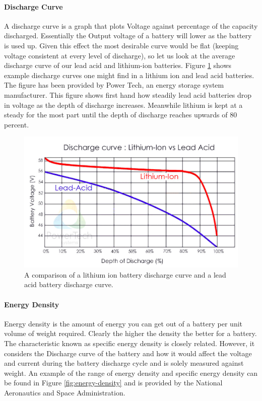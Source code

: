 \paragraph{Discharge Curve}
A discharge curve is a graph that plots Voltage against percentage of the capacity discharged. Essentially the Output voltage of a battery will lower as the battery is used up. Given this effect the most desirable curve would be flat (keeping voltage consistent at every level of discharge), so let us look at the average discharge curve of our lead acid and lithium-ion batteries. Figure \ref{fig:discharge-curve} shows example discharge curves one might find in a lithium ion and lead acid batteries. The figure has been provided by Power Tech, an energy storage system manufacturer. This figure shows first hand how steadily lead acid batteries drop in voltage as the depth of discharge increases. Meanwhile lithium is kept at a steady for the most part until the depth of discharge reaches upwards of 80 percent.

\begin{figure}
    \centering
    \includegraphics[scale=0.4]{figures/discharge curve.png}
    \caption{A comparison of a lithium ion battery discharge curve and a lead acid battery discharge curve.}
    \label{fig:discharge-curve} 
\end{figure}

\paragraph{Energy Density}
Energy density is the amount of energy you can get out of a battery per unit volume of weight required. Clearly the higher the density the better for a battery. The characteristic known as specific energy density is closely related. However, it considers the Discharge curve of the battery and how it would affect the voltage and current during the battery discharge cycle and is solely measured against weight. An example of the range of energy density and specific energy density can be found in Figure \ref{fig:energy-density} and is provided by the National Aeronautics and Space Administration.

